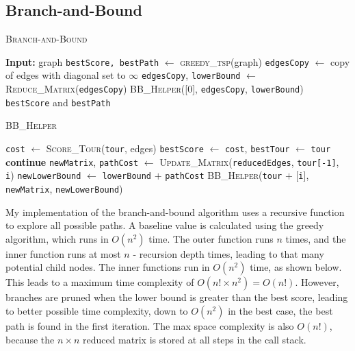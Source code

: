 \documentclass[12pt]{article}
\begin{document}
\subsection{Branch-and-Bound}
\begin{algorithm}[H]
    \caption{\textsc{Branch-and-Bound}}
    \begin{algorithmic}[1]
        \State \textbf{Input:} graph
        \State \texttt{bestScore, bestPath} $\gets$ \textsc{greedy\_tsp}(graph) 
        \State \texttt{edgesCopy} $\gets$ copy of edges with diagonal set to $\infty$
        \State \texttt{edgesCopy}, \texttt{lowerBound} $\gets$ \textsc{Reduce\_Matrix}(\texttt{edgesCopy})
        \State \textsc{BB\_Helper}([0], \texttt{edgesCopy}, \texttt{lowerBound}) 
        \State \Return \texttt{bestScore} and \texttt{bestPath}
    \end{algorithmic}
\end{algorithm}

\begin{algorithm}[H]
    \caption{\textsc{BB\_Helper}}
    \begin{algorithmic}[1]
            \State \texttt{cost} $\gets$ \textsc{Score\_Tour}(\texttt{tour}, edges)
                \State \texttt{bestScore} $\gets$ \texttt{cost}, \texttt{bestTour} $\gets$ \texttt{tour}
            \EndIf
            \State \Return
        \EndIf
         
                \State \textbf{continue}
            \EndIf
            \State \texttt{newMatrix}, \texttt{pathCost} $\gets$ \textsc{Update\_Matrix}(\texttt{reducedEdges}, \texttt{tour[-1]}, \texttt{i})
            \State \texttt{newLowerBound} $\gets$ \texttt{lowerBound} $+$ \texttt{pathCost}
             
                \State \textsc{BB\_Helper}(\texttt{tour} $+$ [\texttt{i}], \texttt{newMatrix}, \texttt{newLowerBound}) 
            \EndIf
        \EndFor
    \end{algorithmic}
\end{algorithm}

My implementation of the branch-and-bound algorithm uses a recursive function
to explore all possible paths. A baseline value is calculated using the greedy
algorithm, which runs in $O(n^2)$ time. The outer function runs $n$ times, and the inner
function runs at most $n$ - recursion depth times, leading to that many potential child nodes.
The inner functions run in $O(n^2)$ time,
as shown below. This leads to a maximum time complexity of
$O(n! \times n^2) = O(n!)$. However, branches are pruned when the lower bound
is greater than the best score, leading to better possible time complexity, down to 
$O(n^2)$ in the best case, the best path is found in the first iteration. The max space
complexity is also $O(n!)$, because the $n \times n $ reduced matrix is stored at
 all steps in the call stack.
\end{document}
